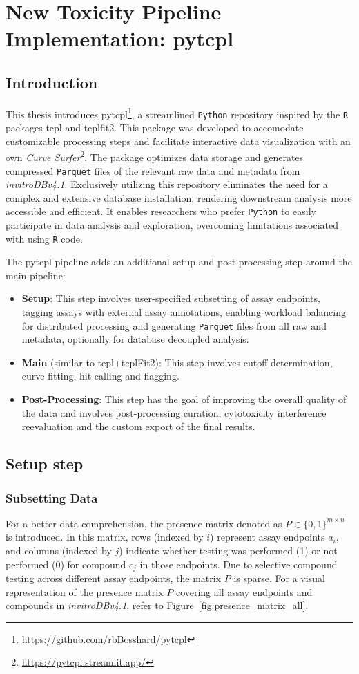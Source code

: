 \section{New Toxicity Pipeline Implementation: pytcpl}\label{sec:pytcpl}
\subsection{Introduction} 
This thesis introduces pytcpl\footnote{\url{https://github.com/rbBosshard/pytcpl}}, a streamlined \texttt{Python} repository inspired by the \texttt{R} packages tcpl and {tcplfit2}. This package was developed to accomodate customizable processing steps and facilitate interactive data visualization with an own \emph{Curve Surfer}\footnote{\url{https://pytcpl.streamlit.app/}}. The package optimizes data storage and generates compressed \texttt{Parquet} files of the relevant raw data and metadata from \emph{invitroDBv4.1}. Exclusively utilizing this repository eliminates the need for a complex and extensive database installation, rendering downstream analysis more accessible and efficient. It enables researchers who prefer \texttt{Python} to easily participate in data analysis and exploration, overcoming limitations associated with using \texttt{R} code.

The pytcpl pipeline adds an additional setup and post-processing step around the main pipeline:
\begin{itemize}
    \item \textbf{Setup}: This step involves user-specified subsetting of assay endpoints, tagging assays with external assay annotations, enabling workload balancing for distributed processing and generating \texttt{Parquet} files from all raw and metadata, optionally for database decoupled analysis.
    \item \textbf{Main} (similar to tcpl+tcplFit2): This step involves cutoff determination, curve fitting, hit calling and flagging.
    \item \textbf{Post-Processing}: This step has the goal of improving the overall quality of the data and involves post-processing curation, cytotoxicity interference reevaluation and the custom export of the final results.
\end{itemize}

\subsection{Setup step}\label{sec:subset_data}
\subsubsection{Subsetting Data}
For a better data comprehension, the presence matrix denoted as $P \in {\{0, 1\}}^{m \times n}$ is introduced. In this matrix, rows (indexed by $i$) represent assay endpoints $a_i$, and columns (indexed by $j$) indicate whether testing was performed (1) or not performed (0) for compound $c_j$ in those endpoints. Due to selective compound testing across different assay endpoints, the matrix $P$ is sparse. For a visual representation of the presence matrix $P$ covering all assay endpoints and compounds in \textit{invitroDBv4.1}, refer to Figure~\ref{fig:presence_matrix_all}.

